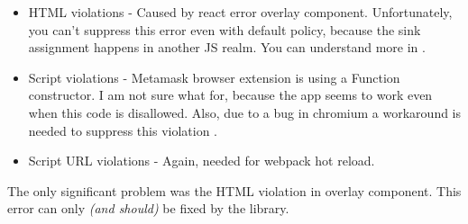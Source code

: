 \begin{itemize}
  \item  HTML violations - Caused by react error overlay component. Unfortunately, you can't
        suppress this error even with default policy, because the sink assignment happens in another
        JS realm. You can understand more in \cite{cross_document_vectors}.
  \item  Script violations - Metamask browser extension is using a Function constructor. I am not
        sure what for, because the app seems to work even when this code is disallowed. Also, due to
        a bug in chromium a workaround is needed to suppress this violation
        \cite{tt_fn_constructor}.
  \item  Script URL violations - Again, needed for webpack hot reload.
\end{itemize}

The only significant problem was the HTML violation in overlay component. This error can only
\emph{(and should)} be fixed by the library.
